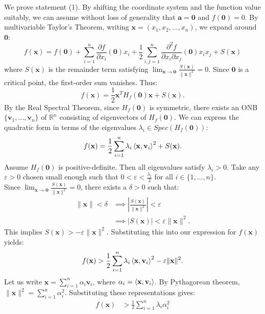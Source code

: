 \begin{pfbox}
	We prove statement (1). By shifting the coordinate system and the function value suitably, we can assume without loss of generality that $\mathbf{a} = \mathbf{0}$ and $f(\mathbf{0}) = 0$. By multivariable Taylor's Theorem, writing $\mathbf{x} = (x_1, x_2, \dots, x_n)$, we expand around $\mathbf{0}$:
	\[
		f(\mathbf{x}) = f(\mathbf{0}) + \sum_{i=1}^n \frac{\partial f}{\partial x_i}(\mathbf{0})x_i + \frac{1}{2}\sum_{i,j=1}^n \frac{\partial^2 f}{\partial x_i \partial x_j}(\mathbf{0})x_i x_j + S(\mathbf{x})
	\]
	where $S(\mathbf{x})$ is the remainder term satisfying $\lim_{\mathbf{x}\to\mathbf{0}} \frac{S(\mathbf{x})}{\|\mathbf{x}\|^2} = 0$. Since $\mathbf{0}$ is a critical point, the first-order sum vanishes. Thus:
	$$
		f(\mathbf{x}) = \frac{1}{2} \mathbf{x}^T H_f(\mathbf{0}) \mathbf{x} + S(\mathbf{x}).
	$$
	By the Real Spectral Theorem, since $H_f(\mathbf{0})$ is symmetric, there exists an ONB $\{\mathbf{v}_1, \dots, \mathbf{v}_n\}$ of $\mathbb{R}^n$ consisting of eigenvectors of $H_f(\mathbf{0})$. We can express the quadratic form in terms of the eigenvalues $\lambda_i \in Spec(H_f(\mathbf{0}))$:
	$$
		f(\mathbf{x}) = \frac{1}{2}\sum_{i=1}^n \lambda_i \left\langle \mathbf{x}, \mathbf{v}_i \right\rangle^2 + S(\mathbf{x}).
	$$
	Assume $H_f(\mathbf{0})$ is positive-definite. Then all eigenvalues satisfy $\lambda_i > 0$. Take any $\varepsilon > 0$ chosen small enough such that $0 < \varepsilon < \frac{\lambda_i}{2}$ for all $i \in \{1, \dots, n\}$.\\
	Since $\lim_{\mathbf{x}\to\mathbf{0}} \frac{S(\mathbf{x})}{\|\mathbf{x}\|^2} = 0$, there exists a $\delta > 0$ such that:
	\begin{align*}
		\|\mathbf{x}\|<\delta
		 & \implies
		\left|\frac{S(\mathbf{x})}{\|\mathbf{x}\|^2}\right|<\varepsilon \\
		 & \implies
		|S(\mathbf{x})|<\varepsilon\|\mathbf{x}\|^2.
	\end{align*}
	This implies $S(\mathbf{x}) > -\varepsilon \|\mathbf{x}\|^2$. Substituting this into our expression for $f(\mathbf{x})$ yields:
	$$
		f(\mathbf{x}) > \frac{1}{2}\sum_{i=1}^n \lambda_i \left\langle \mathbf{x}, \mathbf{v}_i \right\rangle^2 - \varepsilon \|\mathbf{x}\|^2.
	$$
	Let us write $\mathbf{x} = \displaystyle\sum_{i=1}^n \alpha_i \mathbf{v}_i$, where $\alpha_i = \left\langle \mathbf{x}, \mathbf{v}_i \right\rangle$. By Pythagorean theorem, $\|\mathbf{x}\|^2 = \displaystyle\sum_{i=1}^n \alpha_i^2$. Substituting these representations gives:
	\begin{align*}
		f(\mathbf{x})
		 & > \frac{1}{2}\sum_{i=1}^n \lambda_i\alpha_i^2

\end{align*}
\end{pfbox}

